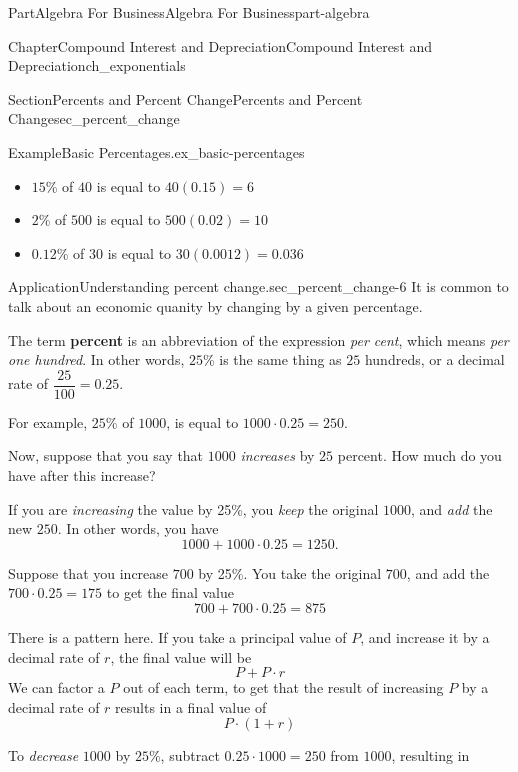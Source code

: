 \documentclass[oneside,10pt,]{tufte-book}
\newcommand{\terminology}[1]{\textbf{#1}}
\numberwithin{equation}{chapter}
\begin{document}
\begin{partptx}{Part}{Algebra For Business}{}{Algebra For Business}{}{}{part-algebra}
\begin{chapterptx}{Chapter}{Compound Interest and Depreciation}{}{Compound Interest and Depreciation}{}{}{ch_exponentials}
\begin{sectionptx}{Section}{Percents and Percent Change}{}{Percents and Percent Change}{}{}{sec_percent_change}
\begin{example}{Example}{Basic Percentages.}{ex_basic-percentages}
\begin{itemize}[label=\textbullet]
\item{}\(15\)\% of \textdollar{}\(40\) is equal to \(40 ( 0.15 )= 6\)%
\item{}\(2\)\% of \textdollar{}\(500\) is equal to \(500 (0.02) = 10\)%
\item{}\(0.12\)\% of \textdollar{}\(30\) is equal to \(30 (0.0012) = 0.036\)%
\end{itemize}
%
\end{example}
\begin{insight}{Application}{Understanding percent change.}{sec_percent_change-6}%
It is common to talk about an economic quanity by changing by a  given percentage.%
\par
The term \terminology{percent} is an abbreviation of the expression \emph{per cent}, which means \emph{per one hundred}. In other words, \(25\)\% is the same thing as \(25\) hundreds, or a decimal rate of \(\dfrac{25}{100}=0.25\).%
\par
For example, \(25\)\% of \(1000\), is equal to \(1000\cdot 0.25 = 250\).%
\par
Now, suppose that you say that \(1000\) \emph{increases} by \(25\) percent.  How much do you have after this increase?%
\par
If you are \emph{increasing} the value by 25\%, you \emph{keep} the original \(1000\), and \emph{add} the new \(250\).  In other words, you have%
\begin{equation*}
1000 + 1000\cdot 0.25 = 1250\text{.}
\end{equation*}
%
\par
Suppose that you increase \(700\) by 25\%.  You take the original \(700\), and add the \(700\cdot 0.25=175\) to get the final value%
\begin{equation*}
700 + 700\cdot 0.25 = 875
\end{equation*}
%
\par
There is a pattern here.  If you take a principal value of \(P\), and increase it by a decimal rate of \(r\), the final value will be%
\begin{equation*}
P + P \cdot r 
\end{equation*}
We can factor a \(P\) out of each term, to get that the result of increasing \(P\) by a decimal rate of \(r\) results in a final value of%
\begin{equation*}
P\cdot (1+r)
\end{equation*}
%
\par
To \emph{decrease} \(1000\) by \(25\)\%, subtract \(0.25 \cdot 1000 = 250\) from \(1000\), resulting in%

\end{insight}
\end{sectionptx}
\end{chapterptx}
\end{partptx}
\end{document}
